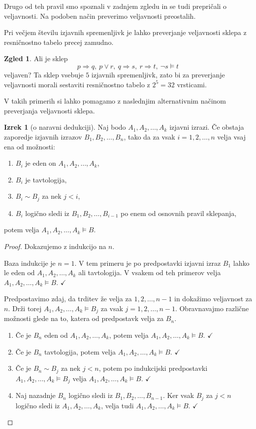 \documentclass[11pt]{book}
\def\kljuka{$\checkmark$}
\theoremstyle{definition}
\theoremstyle{zgled}
\newtheorem*{zgled}{Zgled}
\theoremstyle{odprtproblem}
\theoremstyle{domacanaloga}
\newenvironment{dokaz}
    {\color{siva}\begin{proof}}
    {\end{proof}}
\theoremstyle{izrek}
\newtheorem*{izrek}{Izrek}
\begin{document}
Drugo od teh pravil smo spoznali v zadnjem zgledu in se tudi prepričali o veljavnosti. Na podoben način preverimo veljavnosti preostalih.

Pri večjem številu izjavnih spremenljivk je lahko preverjanje veljavnosti sklepa z resničnostno tabelo precej zamudno.

\begin{zgled}
Ali je sklep
\[
    p \Rightarrow q, \ p \lor r, \ q \Rightarrow s, \ r \Rightarrow t, \ \lnot s \models t
\]
veljaven? Ta sklep vsebuje $5$ izjavnih spremenljivk, zato bi za preverjanje veljavnosti morali sestaviti resničnostno tabelo z $2^5 = 32$ vrsticami.
\end{zgled}

V takih primerih si lahko pomagamo z naslednjim alternativnim načinom preverjanja veljavnosti sklepa.

\begin{izrek}[o naravni dedukciji]
Naj bodo $A_1, A_2, \dots, A_k$ izjavni izrazi. Če obstaja zaporedje izjavnih izrazov $B_1, B_2, \dots, B_n$, tako da za vsak $i = 1, 2, \dots, n$ velja vsaj ena od možnosti:
\begin{enumerate}
    \item $B_i$ je eden on $A_1, A_2, \dots, A_k$,
    \item $B_i$ je tavtologija,
    \item $B_i \sim B_j$ za nek $j < i$,
    \item $B_i$ logično sledi iz $B_1, B_2, \dots, B_{i-1}$ po enem od osnovnih pravil sklepanja,
\end{enumerate}
potem velja $A_1, A_2, \dots, A_k \models B$.
\end{izrek}
\begin{dokaz}
Dokazujemo z indukcijo na $n$.

Baza indukcije je $n = 1$. V tem primeru je po predpostavki izjavni izraz $B_1$ lahko le eden od $A_1, A_2, \dots, A_k$ ali tavtologija. V vsakem od teh primerov velja $A_1, A_2, \dots, A_k \models B$. \kljuka

Predpostavimo zdaj, da trditev že velja za $1, 2, \dots, n-1$ in dokažimo veljavnost za $n$. Drži torej $A_1, A_2, \dots, A_k \models B_j$ za vsak $j = 1, 2, \dots, n-1$. Obravnavajmo različne možnosti glede na to, katera od predpostavk velja za $B_n$.
\begin{enumerate}
    \item Če je $B_n$ eden od $A_1, A_2, \dots, A_k$, potem velja $A_1, A_2, \dots, A_k \models B$. \kljuka
    \item Če je $B_n$ tavtologija, potem velja $A_1, A_2, \dots, A_k \models B$. \kljuka
    \item Če je $B_n \sim B_j$ za nek $j < n$, potem po indukcijski predpostavki $A_1, A_2, \dots, A_k \models B_j$ velja $A_1, A_2, \dots, A_k \models B$. \kljuka
    \item Naj nazadnje $B_n$ logično sledi iz $B_1, B_2, \dots, B_{n-1}$. Ker vsak $B_j$ za $j < n$ logično sledi iz $A_1, A_2, \dots, A_k$, velja tudi $A_1, A_2, \dots, A_k \models B$. \kljuka
\end{enumerate}
\end{dokaz}
\end{document}
